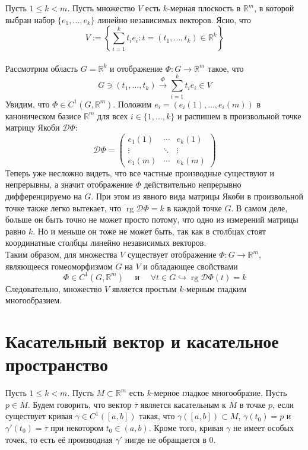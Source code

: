 \documentclass[11pt]{article}
\DeclareMathOperator{\rg}{rg}
\begin{document}
\begin{example} \label{example:1.2}
    Пусть $1\le k<m$. Пусть множество $V$ есть $k$-мерная плоскость в $\mathbb{R}^m$, в которой выбран набор $\{e_1, \ldots, e_k\}$ линейно независимых векторов. Ясно, что
    \[V := \left\{\sum_{i = 1}^k t_i e_i : t = (t_1, \ldots, t_k) \in \mathbb{R}^k\right\}\] \\
    Рассмотрим область $G = \mathbb{R}^k$ и отображение $\Phi \colon G \to \mathbb{R}^m$ такое, что
    \[ G\ni (t_1, \ldots, t_k)   \xrightarrow{\Phi} \sum_{i=1} ^k t_i e_i \in V\]
    Увидим, что $\Phi \in C^{1}(G, \mathbb{R}^m)$. Положим $e_i = (e_i(1), \ldots, e_i(m))$ в каноническом базисе $\mathbb{R}^m$ для всех $i \in \{1, \ldots, k\}$ и распишем в произвольной точке матрицу Якоби $\mathcal{D}\Phi$:
    \[ \mathcal{D}\Phi =
    \begin{pmatrix}
        e_1(1) & \cdots & e_k(1) \\
        \vdots & \ddots & \vdots \\
        e_1(m) & \cdots & e_k(m) 
    \end{pmatrix} \]
    Теперь уже несложно видеть, что все частные производные существуют и непрерывны, а значит отображение $\Phi$ действительно непрерывно дифференцируемо на $G$. При этом из явного вида матрицы Якоби в произвольной точке также легко вытекает, что $\rg \mathcal{D}\Phi = k$ в каждой точке $G$. В самом деле, больше он быть точно не может просто потому, что одно из измерений матрицы равно $k$. Но и меньше он тоже не может быть, так как в столбцах стоят координатные столбцы линейно независимых векторов. \\
    Таким образом, для множества $V$ существует отображение $\Phi \colon G \to \mathbb{R}^m$, являющееся гомеоморфизмом $G$ на $V$ и обладающее свойствами
    \[\Phi \in C^{1}(G, \mathbb{R}^m) \quad \text{ и } \quad \forall t \in G \hookrightarrow \rg \mathcal{D}\Phi(t) = k\]
    Следовательно, множество $V$ является простым $k$-мерным гладким многообразием.

\end{example}
 
\section{Касательный вектор и касательное пространство}
\begin{definition}
    Пусть $1 \leq k < m$. Пусть $M \subset \mathbb{R}^m$ есть $k$-мерное гладкое многообразие. Пусть $p \in M$.
    Будем говорить, что вектор $\overline{\tau}$ является касательным к $M$ в точке $p$, если
    существует кривая $\gamma \in C^{1}([a,b])$ такая, что 
    $\gamma ([a, b]) \subset M$, $\gamma(t_0) = p$ и $\gamma'(t_0) = \overline{\tau}$
    при некотором $t_0\in (a,b)$. Кроме того, кривая $\gamma$ не имеет особых точек, то есть её производная $\gamma'$ нигде не обращается в $0$.

\end{definition}
\end{document}
